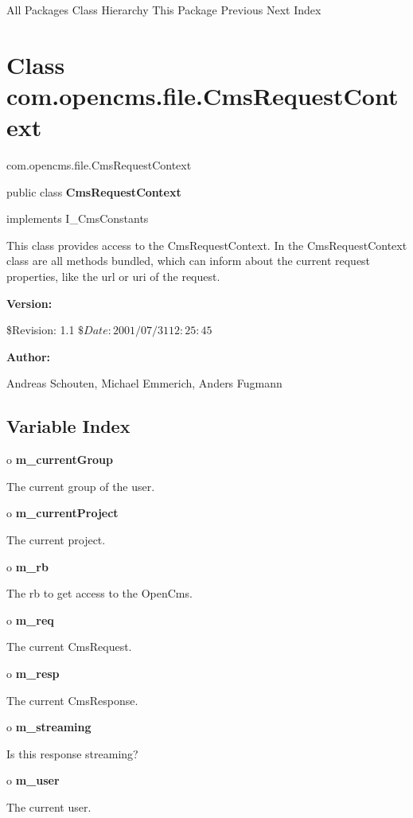 \begin{PRE}
All Packages  Class Hierarchy  This Package  Previous  Next  Index
\end{PRE}

\htmlHR

\section{  Class com.opencms.file.CmsRequestContext }

\begin{PRE}
com.opencms.file.CmsRequestContext
\end{PRE}

\htmlHR

\begin{description}
\item public class {\bf CmsRequestContext}  
\item implements I\_CmsConstants 
\end{description}

This class provides access to the CmsRequestContext. \htmlBR
In the CmsRequestContext class are all methods bundled, which can inform about
the current request properties, like the url or uri of the request. 

\begin{description}
\item {\bf Version:}  

\$Revision: 1.1 $ \$Date: 2001/07/31 12:25:45 $  
\item {\bf Author:}  

Andreas Schouten, Michael Emmerich, Anders Fugmann 
\end{description}

\htmlHR

\subsection*{  Variable Index }

\begin{description}
\item o {\bf m\_currentGroup}  

The current group of the user.  
\item o {\bf m\_currentProject}  

The current project.  
\item o {\bf m\_rb}  

The rb to get access to the OpenCms.  
\item o {\bf m\_req}  

The current CmsRequest.  
\item o {\bf m\_resp}  

The current CmsResponse.  
\item o {\bf m\_streaming}  

Is this response streaming?  
\item o {\bf m\_user}  

The current user. 
\end{description}

